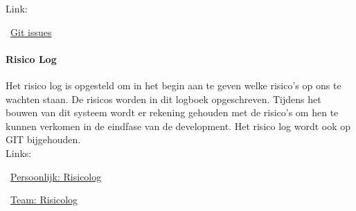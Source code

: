 \documentclass{article}
\begin{document}
Link:

\MVAt~\href{https://github.com/Gewad/Project4Bankalicious/issues}{Git issues}

\paragraph{Risico Log}
Het risico log is opgesteld om in het begin aan te geven
welke risico's op ons te wachten staan.
De risicos worden in dit logboek opgeschreven.
Tijdens het bouwen van dit systeem wordt er rekening gehouden met de risico's
om hen te kunnen verkomen in de eindfase van de development.
Het risico log wordt ook op GIT bijgehouden.\\

Links:

\MVAt~\href{https://github.com/Gewad/Project4Bankalicious/blob/test/opdrachten/opdracht_h/opdracht_h_wondel/risicolog.xlsx}{Persoonlijk: Risicolog}

\MVAt~\href{https://github.com/Gewad/Project4Bankalicious/blob/test/opdrachten/opdracht_hj/opdracht_h_teamonderdeel.xlsx}{Team: Risicolog}
\end{document}
